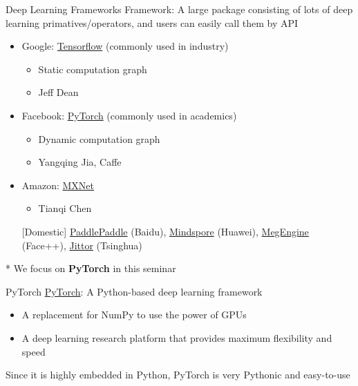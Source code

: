\documentclass{../TexTemplate/myslide}
\begin{document}
\begin{frame}{Deep Learning Frameworks}
Framework: A large package consisting of lots of deep learning primatives/operators, and users can easily call them by API
\begin{itemize}
	\item Google: \href{https://www.tensorflow.org/}{Tensorflow} (commonly used in industry)
	\begin{itemize}
		\item Static computation graph
		\item Jeff Dean
	\end{itemize}
	\item Facebook: \href{https://pytorch.org/}{PyTorch} (commonly used in academics)
	\begin{itemize}
		\item Dynamic computation graph
		\item Yangqing Jia, Caffe
	\end{itemize}
	\item Amazon: \href{https://mxnet.apache.org/}{MXNet}
	\begin{itemize}
		\item Tianqi Chen
	\end{itemize}
	\item[] [Domestic] \href{https://www.paddlepaddle.org.cn/}{PaddlePaddle} (Baidu), \href{https://github.com/mindspore-ai/mindspore}{Mindspore} (Huawei), \href{https://github.com/MegEngine/MegEngine}{MegEngine} (Face++), \href{https://github.com/Jittor/jittor}{Jittor} (Tsinghua)
\end{itemize}
* We focus on \textbf{PyTorch} in this seminar
\end{frame}

\begin{frame}{PyTorch}
\href{https://pytorch.org/}{PyTorch}: A Python-based deep learning framework
\begin{itemize}
	\item A replacement for NumPy to use the power of GPUs
	\item A deep learning research platform that provides maximum flexibility and speed
\end{itemize}
Since it is highly embedded in Python, PyTorch is very Pythonic and easy-to-use
\end{frame}
\end{document}
